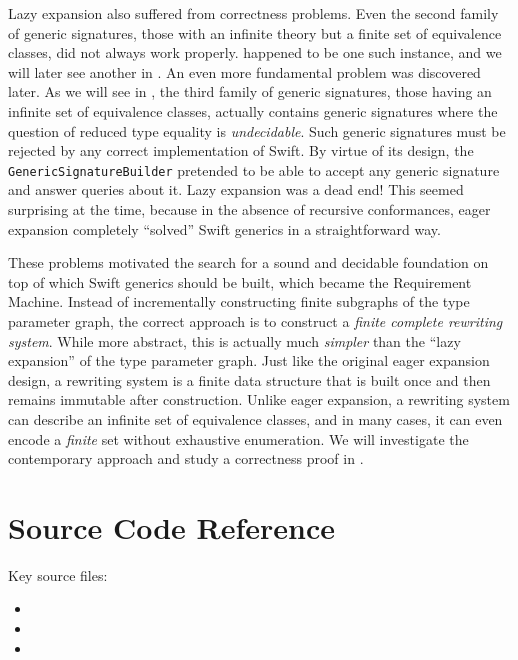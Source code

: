 \documentclass[../generics]{subfiles}
\begin{document}
Lazy expansion also suffered from correctness problems. Even the second family of generic signatures, those with an infinite theory but a finite set of equivalence classes, did not always work properly.  happened to be one such instance, and we will later see another in . An even more fundamental problem was discovered later. As we will see in , the third family of generic signatures, those having an infinite set of equivalence classes, actually contains generic signatures where the question of reduced type equality is \emph{undecidable}. Such generic signatures must be rejected by any correct implementation of Swift. By virtue of its design, the \texttt{GenericSignatureBuilder} pretended to be able to accept any generic signature and answer queries about it. Lazy expansion was a dead end! This seemed surprising at the time, because in the absence of recursive conformances, eager expansion completely ``solved'' Swift generics in a straightforward way.

These problems motivated the search for a sound and decidable foundation on top of which Swift generics should be built, which became the Requirement Machine. Instead of incrementally constructing finite subgraphs of the type parameter graph, the correct approach is to construct a \emph{finite complete rewriting system}. While more abstract, this is actually much \emph{simpler} than the ``lazy expansion'' of the type parameter graph. Just like the original eager expansion design, a rewriting system is a finite data structure that is built once and then remains immutable after construction. Unlike eager expansion, a rewriting system can describe an infinite set of equivalence classes, and in many cases, it can even encode a \emph{finite} set without exhaustive enumeration. We will investigate the contemporary approach and study a correctness proof in .

\section{Source Code Reference}\label{src:archetypes}

Key source files:
\begin{itemize}
\item {}
\item {}
\item {}
\end{itemize}
\end{document}
